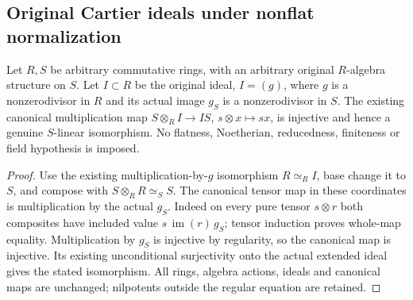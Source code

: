 \subsection{Original Cartier ideals under nonflat normalization}
\begin{lemma}
\label{lem:nonflat-cartier-principal-tensor}
\leanok
{}
Let $R,S$ be arbitrary commutative rings, with an arbitrary original
$R$-algebra structure on $S$. Let $I\subset R$ be the original ideal,
$I=(g)$, where $g$ is a nonzerodivisor in $R$ and its actual image
$g_S$ is a nonzerodivisor in $S$. The existing canonical multiplication
map $S\otimes_R I\longrightarrow IS$, $s\otimes x\mapsto s x$,
is injective and hence a genuine $S$-linear isomorphism. No flatness,
Noetherian, reducedness, finiteness or field hypothesis is imposed.
\end{lemma}
\begin{proof}
Use the existing multiplication-by-$g$ isomorphism $R\simeq_R I$,
base change it to $S$, and compose with $S\otimes_R R\simeq_S S$.
The canonical tensor map in these coordinates is multiplication by the
actual $g_S$. Indeed on every pure tensor $s\otimes r$ both composites
have included value $s\,\operatorname{im}(r)\,g_S$; tensor induction proves
whole-map equality. Multiplication by $g_S$ is injective by regularity,
so the canonical map is injective. Its existing unconditional surjectivity
onto the actual extended ideal gives the stated isomorphism. All rings,
algebra actions, ideals and canonical maps are unchanged; nilpotents
outside the regular equation are retained.
\end{proof}

